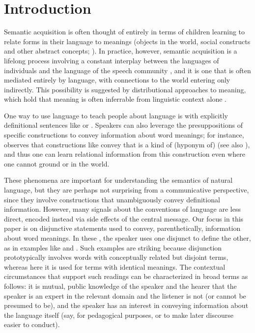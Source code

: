 \section{Introduction}\label{sec:intro}

Semantic acquisition is often thought of entirely in terms of children
learning to relate forms in their language to meanings (objects in the
world, social constructs and other abstract concepts;
\cite{Frank:Goodman:Tenenbaum:2009}). In practice, however, semantic
acquisition is a lifelong process involving a constant interplay
between the languages of individuals and the language of the speech
community \cite{Lewis75LL}, and it is one that is often mediated
entirely by language, with connections to the world entering only
indirectly. This possibility is suggested by distributional approaches
to meaning, which hold that meaning is often inferrable from
linguistic context alone \cite{Harris54,TurneyPantel10}.

One way to use language to teach people about language is with
explicitly definitional sentences like  or . Speakers can also leverage the presuppositions of
specific constructions to convey information about word meanings; for
instance, \cite{Hearst92} observes that constructions like  convey that  is a kind of (hyponym of) 
(see also \cite{SnowEtAl05}), and thus one can learn relational
information from this construction even where one cannot ground
 or  in the world.

These phenomena are important for understanding the semantics of
natural language, but they are perhaps not surprising from a
communicative perspective, since they involve constructions that
unambiguously convey definitional information.  However, many signals
about the conventions of language are less direct, encoded instead via
side effects of the central message.  Our focus in this paper is on
disjunctive statements used to convey, parenthetically, information
about word meanings. In these , the
speaker uses one disjunct to define the other, as in examples like
 and .
Such examples are striking because disjunction prototypically involves
words with conceptually related but disjoint terms, whereas here it is
used for terms with identical meanings.  The contextual circumstances
that support such readings can be characterized in broad terms as
follows: it is mutual, public knowledge of the speaker and the hearer
that the speaker is an expert in the relevant domain and the listener
is not (or cannot be presumed to be), and the speaker has an interest
in conveying information about the language itself (say, for
pedagogical purposes, or to make later discourse easier to conduct).

